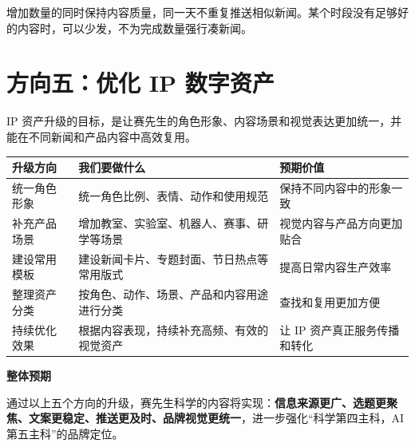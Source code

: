 \documentclass[UTF8,11pt,a4paper,fontset=none]{ctexart}
\begin{document}
\begin{center}
\end{center}

\begin{summarybox}[推送原则]
增加数量的同时保持内容质量，同一天不重复推送相似新闻。某个时段没有足够好的内容时，可以少发，不为完成数量强行凑新闻。
\end{summarybox}

\section{方向五：优化 IP 数字资产}

IP 资产升级的目标，是让赛先生的角色形象、内容场景和视觉表达更加统一，并能在不同新闻和产品内容中高效复用。

\begin{tabularx}{\textwidth}{@{}L{40mm} Y Y@{}}
\toprule
\textbf{升级方向} & \textbf{我们要做什么} & \textbf{预期价值} \\
\midrule
统一角色形象 & 统一角色比例、表情、动作和使用规范 & 保持不同内容中的形象一致 \\
补充产品场景 & 增加教室、实验室、机器人、赛事、研学等场景 & 视觉内容与产品方向更加贴合 \\
建设常用模板 & 建设新闻卡片、专题封面、节日热点等常用版式 & 提高日常内容生产效率 \\
整理资产分类 & 按角色、动作、场景、产品和内容用途进行分类 & 查找和复用更加方便 \\
持续优化效果 & 根据内容表现，持续补充高频、有效的视觉资产 & 让 IP 资产真正服务传播和转化 \\
\bottomrule
\end{tabularx}

\vspace{6mm}
\begin{tcolorbox}[colback=BrandNavy,colframe=BrandNavy,arc=2mm,boxrule=0pt,left=6mm,right=6mm,top=5mm,bottom=5mm]
{\sffamily\bfseries\Large\color{white}整体预期}\par
{\color{white!90}通过以上五个方向的升级，赛先生科学的内容将实现：\textbf{信息来源更广、选题更聚焦、文案更稳定、推送更及时、品牌视觉更统一}，进一步强化“科学第四主科，AI 第五主科”的品牌定位。}
\end{tcolorbox}
\end{document}
